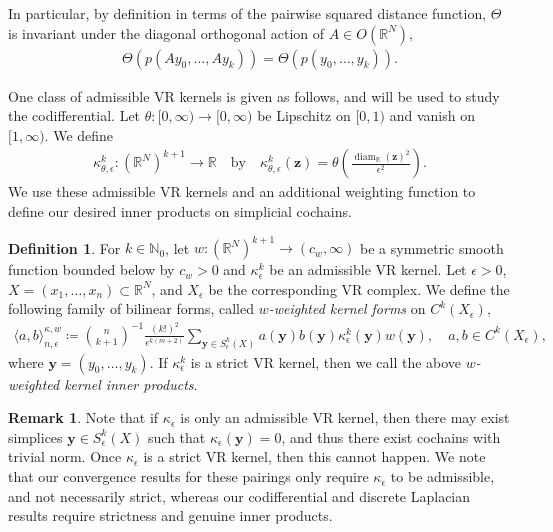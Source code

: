 \documentclass[11pt,reqno]{amsproc}
\numberwithin{equation}{section}
\newcommand{\N}{\mathbb{N}}
\newcommand{\R}{\mathbb{R}}
\newcommand{\by}{\mathbf{y}}
\newcommand{\bz}{\mathbf{z}}
\newcommand{\diam}{\operatorname{diam}}
\theoremstyle{definition}
\newtheorem{definition}[counter]{Definition}
\newtheorem{remark}[counter]{Remark}
\theoremstyle{plain}
\begin{document}
    In particular, by definition in terms of the pairwise squared distance function, $\Theta$ is invariant under the diagonal orthogonal action of $A \in O(\R^N)$,
    \begin{align}
        \Theta(p(Ay_0, \ldots, Ay_k)) = \Theta(p(y_0, \ldots, y_k)).
    \end{align}


    One class of admissible VR kernels is given as follows, and will be used to study the codifferential. Let $\theta: [0,\infty) \to [0,\infty)$ be Lipschitz on $[0,1)$ and vanish on $[1,\infty)$. We define
    \begin{align}
        \kappa^k_{\theta, \epsilon} : (\R^N)^{k+1} \to \R \quad \text{by} \quad \kappa^k_{\theta, \epsilon}(\bz) = \theta \left( \frac{\diam_\R(\bz)^2}{\epsilon^2} \right).
    \end{align}
    We use these admissible VR kernels and an additional weighting function to define our desired inner products on simplicial cochains. 

    \begin{definition}
    For $k \in \N_0$, let $w:(\R^N)^{k+1} \to (c_w, \infty)$ be a symmetric smooth function bounded below by $c_w>0$ and $\kappa^k_\epsilon$ be an admissible VR kernel. Let $\epsilon > 0$, $X = (x_1, \ldots, x_n) \subset \R^N$, and $X_\epsilon$ be the corresponding VR complex. We define the following family of bilinear forms, called \emph{$w$-weighted kernel forms} on $C^k(X_\epsilon)$,  
    \begin{align} \label{eq:inner_prod}
        \langle a, b \rangle_{n,\epsilon}^{\kappa,w} \coloneqq \binom{n}{k+1}^{-1} \frac{(k!)^2}{\epsilon^{k(m+2)}}\sum_{\by \in S^k_\epsilon(X)} a(\by) b(\by)  \kappa^k_\epsilon(\by) w(\by), \quad a,b \in C^k(X_\epsilon),
    \end{align}
    where $\by = (y_0, \ldots, y_k)$. If $\kappa^k_\epsilon$ is a strict VR kernel, then we call the above \emph{$w$-weighted kernel inner products}.
    \end{definition}

    \begin{remark} \label{rem:admissible_vs_strict}
        Note that if $\kappa_\epsilon$ is only an admissible VR kernel, then there may exist simplices $\by \in S^k_\epsilon(X)$ such that $\kappa_\epsilon(\by) = 0$, and thus there exist cochains with trivial norm. Once $\kappa_\epsilon$ is a strict VR kernel, then this cannot happen. We note that our convergence results for these pairings only require $\kappa_\epsilon$ to be admissible, and not necessarily strict, whereas our codifferential and discrete Laplacian results require strictness and genuine inner products.
    \end{remark}
\end{document}

